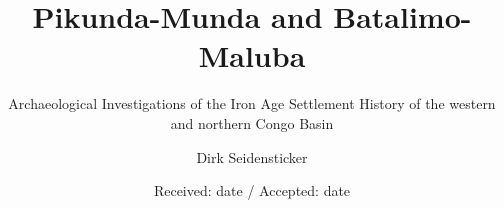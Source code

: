\documentclass[smallextended,natbib]{svjour3}       %
\begin{document}
	
\title{Pikunda-Munda and Batalimo-Maluba}
\subtitle{Archaeological Investigations of the Iron Age Settlement History of the western and northern Congo Basin}

\author{}
\author{Dirk Seidensticker}


\date{Received: date / Accepted: date}

\maketitle
\end{document}
